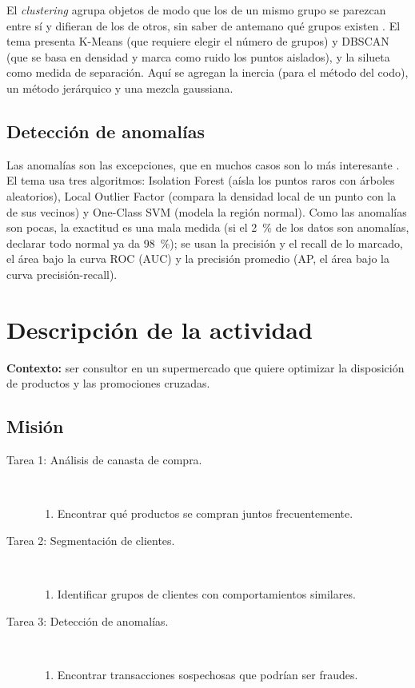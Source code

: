 \documentclass[11pt,letterpaper]{article}
\begin{document}
El \textit{clustering} agrupa objetos de modo que los de un mismo grupo se parezcan entre sí y difieran de los de otros, sin saber de antemano qué grupos existen \parencite{iae_u4_t45}. El tema presenta K-Means (que requiere elegir el número de grupos) y DBSCAN (que se basa en densidad y marca como ruido los puntos aislados), y la silueta como medida de separación. Aquí se agregan la inercia (para el método del codo), un método jerárquico y una mezcla gaussiana.

\subsection{Detección de anomalías}

Las anomalías son las excepciones, que en muchos casos son lo más interesante \parencite{iae_u4_t45}. El tema usa tres algoritmos: Isolation Forest (aísla los puntos raros con árboles aleatorios), Local Outlier Factor (compara la densidad local de un punto con la de sus vecinos) y One-Class SVM (modela la región normal). Como las anomalías son pocas, la exactitud es una mala medida (si el 2~\% de los datos son anomalías, declarar todo normal ya da 98~\%); se usan la precisión y el recall de lo marcado, el área bajo la curva ROC (AUC) y la precisión promedio (AP, el área bajo la curva precisión-recall).

\section{Descripción de la actividad}

\textbf{Contexto:} ser consultor en un supermercado que quiere optimizar la disposición de productos y las promociones cruzadas.

\subsection*{Misión}

\begin{description}
    \item[Tarea 1: Análisis de canasta de compra.]\mbox{}\\[-1.3\baselineskip]
    \begin{enumerate}
        \item Encontrar qué productos se compran juntos frecuentemente.
    \end{enumerate}
    \item[Tarea 2: Segmentación de clientes.]\mbox{}\\[-1.3\baselineskip]
    \begin{enumerate}
        \item Identificar grupos de clientes con comportamientos similares.
    \end{enumerate}
    \item[Tarea 3: Detección de anomalías.]\mbox{}\\[-1.3\baselineskip]
    \begin{enumerate}
        \item Encontrar transacciones sospechosas que podrían ser fraudes.
    \end{enumerate}
\end{description}
\end{document}
